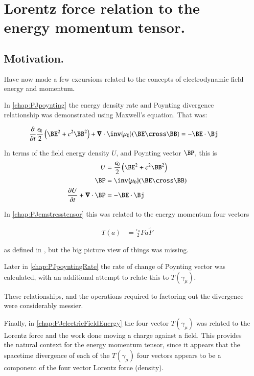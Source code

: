\chapter{Lorentz force relation to the energy momentum tensor.}\label{chap:PJstressEnergyLorentz}
\date{ Feb 13, 2009.  $RCSfile: stressEnergyLorentz.tex,v $ Last $Revision: 1.13 $ $Date: 2009/06/11 16:45:58 $ }

\section{Motivation. }

Have now made a few excursions related to the concepts of electrodynamic
field energy and momentum.

In \ref{chap:PJpoynting} the energy density rate and Poynting divergence 
relationship was demonstrated using Maxwell's equation.  That was:

\begin{align}
\PD{t}{}\frac{\epsilon_0}{2} \left(\BE^2 + c^2 \BB^2\right) + \spacegrad \cdot \inv{\mu_0}(\BE \cross \BB) &= -\BE \cdot \Bj 
\end{align}

In terms of the field energy density $U$, and Poynting vector $\BP$, this is
\begin{align}\label{eqn:seLorentz:energyDensityPoyntingDefined}
U &= \frac{\epsilon_0}{2} \left(\BE^2 + c^2 \BB^2\right) \\
\BP &= \inv{\mu_0}(\BE \cross \BB) \\
\PD{t}{U} + \spacegrad \cdot \BP &= -\BE \cdot \Bj 
\end{align}

In \ref{chap:PJemstresstensor} this was related to the 
energy momentum four vectors

\begin{align}\label{eqn:seLorentz:lorentzForceT}
T(a) &= \frac{\epsilon_0}{2} F a \tilde{F}
\end{align}

as defined
in \cite{doran2003gap}, but the big picture view 
of things was missing.

Later in \ref{chap:PJpoyntingRate} the rate of change of Poynting vector
was calculated, with an additional attempt to relate this to $T(\gamma_\mu)$.

These relationships, and the operations required to factoring out the divergence were considerably messier.

Finally, in \ref{chap:PJelectricFieldEnergy} the four vector $T(\gamma_\mu)$
was related to the Lorentz force and the work done moving a charge against
a field.  This provides the natural context for the energy momentum tensor, 
since it appears that the spacetime divergence of each of the
$T(\gamma_\mu)$ four vectors appears to be a component of the
four vector Lorentz force (density).  


